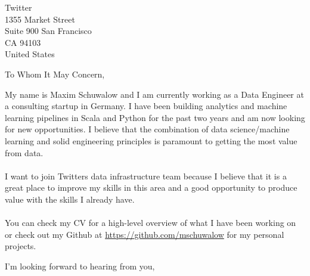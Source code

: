 \documentclass[custom,paper=a4,version=last]{scrlttr2}
\begin{document}
\begin{letter}{
  Twitter\\
  1355 Market Street\\
  Suite 900 San Francisco\\
  CA 94103\\
  United States
}

\opening{To Whom It May Concern,}

My name is Maxim Schuwalow and I am currently working as a Data Engineer at a consulting startup in Germany. I have been building analytics and machine learning pipelines in Scala and Python for the past two years and am now looking for new opportunities. I believe that the combination of data science/machine learning and solid engineering principles is paramount to getting the most value from data.\\\\
I want to join Twitters data infrastructure team because I believe that it is a great place to improve my skills in this area and a good opportunity to produce value with the skills I already have.\\\\
You can check my CV for a high-level overview of what I have been working on or check out my Github at \href{https://github.com/mschuwalow}{https://github.com/mschuwalow} for my personal projects.

\closing{I'm looking forward to hearing from you,}

\end{letter}
\end{document}

